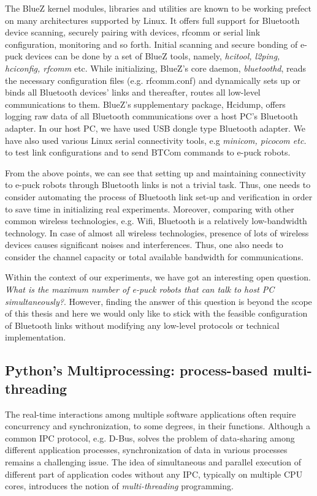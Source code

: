 The BlueZ kernel modules, libraries and utilities are known to be working prefect on many architectures supported by Linux. It offers full support for Bluetooth device scanning, securely pairing with devices,  rfcomm or serial link configuration, monitoring and so forth. Initial  scanning and secure bonding of e-puck devices can be done by a set of BlueZ tools, namely, {\em hcitool, l2ping, hciconfig, rfcomm} etc. While initializing, BlueZ's  core daemon, {\em bluetoothd}, reads the necessary configuration files (e.g. rfcomm.conf) and dynamically sets up or binds all Bluetooth devices' links and thereafter, routes all low-level communications to them. BlueZ's supplementary package, Hcidump, offers logging raw data of all Bluetooth communications over a host PC's Bluetooth adapter.  In our host PC, we have used USB dongle type  Bluetooth adapter. We have also used various Linux serial connectivity tools, e.g {\em minicom, picocom etc.} to test link configurations and to send BTCom commands to e-puck robots.

From the above points, we can see that setting up and maintaining connectivity to e-puck robots through Bluetooth links is  not a trivial task. Thus, one needs to consider automating the process of Bluetooth link set-up and verification in order to save time in initializing real experiments. Moreover, comparing with other common wireless technologies, e.g. Wifi, Bluetooth is a relatively low-bandwidth technology. In case of almost all wireless technologies, presence of lots of wireless devices  causes significant noises and interferences. Thus, one also needs to consider the channel capacity or total available bandwidth for communications. 

Within the context of our experiments, we have got an interesting open question. {\em What is the maximum number of e-puck robots that can talk to host PC simultaneously?}. However, finding the answer of this question is beyond the scope of this thesis and here we would only like  to stick with the feasible configuration of Bluetooth links without modifying any low-level protocols or technical implementation.
\subsection{Python's Multiprocessing: process-based multi-threading}
\label{expt-tools:python}
The real-time interactions among multiple software applications often require concurrency and synchronization, to some degrees, in their functions. Although a common IPC protocol, e.g. D-Bus, solves the problem of data-sharing among different application processes, synchronization of data in various processes remains a challenging issue.   The idea of simultaneous and parallel execution of different part of application codes without any IPC, typically on  multiple CPU cores, introduces the notion of {\em multi-threading} programming. 

